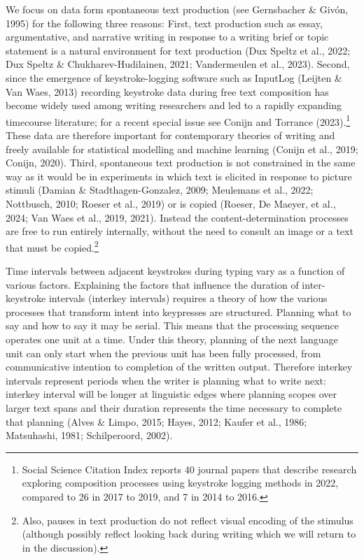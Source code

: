 \documentclass[
  man,floatsintext]{apa7}
\begin{document}
We focus on data form spontaneous text production (see Gernsbacher \& Givón, 1995) for the following three reasons: First, text production such as essay, argumentative, and narrative writing in response to a writing brief or topic statement is a natural environment for text production (Dux Speltz et al., 2022; Dux Speltz \& Chukharev-Hudilainen, 2021; Vandermeulen et al., 2023). Second, since the emergence of keystroke-logging software such as InputLog (Leijten \& Van Waes, 2013) recording keystroke data during free text composition has become widely used among writing researchers and led to a rapidly expanding timecourse literature; for a recent special issue see Conijn and Torrance (2023).\footnote{Social Science Citation Index reports 40 journal papers that describe research exploring composition processes using keystroke logging methods in 2022, compared to 26 in 2017 to 2019, and 7 in 2014 to 2016.} These data are therefore important for contemporary theories of writing and freely available for statistical modelling and machine learning (Conijn et al., 2019; Conijn, 2020). Third, spontaneous text production is not constrained in the same way as it would be in experiments in which text is elicited in response to picture stimuli (Damian \& Stadthagen-Gonzalez, 2009; Meulemans et al., 2022; Nottbusch, 2010; Roeser et al., 2019) or is copied (Roeser, De Maeyer, et al., 2024; Van Waes et al., 2019, 2021). Instead the content-determination processes are free to run entirely internally, without the need to consult an image or a text that must be copied.\footnote{Also, pauses in text production do not reflect visual encoding of the stimulus (although possibly reflect looking back during writing which we will return to in the discussion).}

Time intervals between adjacent keystrokes during typing vary as a function of various factors. Explaining the factors that influence the duration of inter-keystroke intervals (interkey intervals) requires a theory of how the various processes that transform intent into keypresses are structured. Planning what to say and how to say it may be serial. This means that the processing sequence operates one unit at a time. Under this theory, planning of the next language unit can only start when the previous unit has been fully processed, from communicative intention to completion of the written output. Therefore interkey intervals represent periods when the writer is planning what to write next: interkey interval will be longer at linguistic edges where planning scopes over larger text spans and their duration represents the time necessary to complete that planning (Alves \& Limpo, 2015; Hayes, 2012; Kaufer et al., 1986; Matsuhashi, 1981; Schilperoord, 2002).
\end{document}
